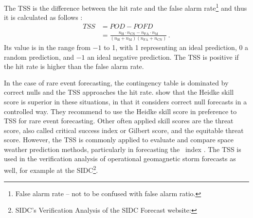 The TSS is the difference between the hit rate and the false alarm rate\footnote{False alarm rate -- not to be confused with false alarm ratio.} and thus it is calculated as follows \citep[Eq.~15]{Hanssen1965}:
\begin{align}
	\mathit{TSS} &= \mathit{POD} - \mathit{POFD}\\
		&= \frac{n_\text{H} \cdot n_\text{CN} - n_\text{FA} \cdot n_\text{M}}{\left(n_\text{H}+n_\text{M}\right) (n_\text{FA}+n_\text{CN})}	\,.	\nonumber	\label{eq:true_skill_score}
\end{align}
Its value is in the range from $-1$ to 1, with 1 representing an ideal prediction, 0 a random prediction, and $-1$ an ideal negative prediction. The TSS is positive if the hit rate is higher than the false alarm rate.

In the case of rare event forecasting, the contingency table is dominated by correct nulls and the TSS approaches the hit rate. \citet{Doswell1990} show that the Heidke skill score is superior in these situations, in that it considers correct null forecasts in a controlled way. They recommend to use the Heidke skill score in preference to TSS for rare event forecasting. Other often applied skill scores are the threat score, also called critical success index or Gilbert score, and the equitable threat score. However, the TSS is commonly applied to evaluate and compare space weather prediction methods, particularly in forecasting the \Kp~index \citep{Detman1999,Wing2005,Savani2017}. The TSS is used in the verification analysis of operational geomagnetic storm forecasts as well, for example at the SIDC\footnote{SIDC's Verification Analysis of the SIDC Forecast website: }.




